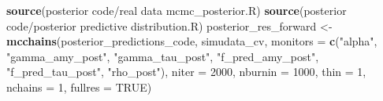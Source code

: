 \documentclass[
]{article}
\newenvironment{Shaded}{\begin{snugshade}}{\end{snugshade}}
\newcommand{\AttributeTok}[1]{\textcolor[rgb]{0.13,0.29,0.53}{#1}}
\newcommand{\CommentTok}[1]{\textcolor[rgb]{0.56,0.35,0.01}{\textit{#1}}}
\newcommand{\ConstantTok}[1]{\textcolor[rgb]{0.56,0.35,0.01}{#1}}
\newcommand{\DecValTok}[1]{\textcolor[rgb]{0.00,0.00,0.81}{#1}}
\newcommand{\FunctionTok}[1]{\textcolor[rgb]{0.13,0.29,0.53}{\textbf{#1}}}
\newcommand{\NormalTok}[1]{#1}
\newcommand{\OtherTok}[1]{\textcolor[rgb]{0.56,0.35,0.01}{#1}}
\newcommand{\SpecialCharTok}[1]{\textcolor[rgb]{0.81,0.36,0.00}{\textbf{#1}}}
\newcommand{\StringTok}[1]{\textcolor[rgb]{0.31,0.60,0.02}{#1}}
\begin{document}
\begin{Shaded}
\end{Shaded}

\begin{Shaded}
\begin{Highlighting}[]
\FunctionTok{source}\NormalTok{(}\StringTok{\textquotesingle{}posterior code/real data mcmc\_posterior.R\textquotesingle{}}\NormalTok{)}
\FunctionTok{source}\NormalTok{(}\StringTok{\textquotesingle{}posterior code/posterior predictive distribution.R\textquotesingle{}}\NormalTok{)}
\NormalTok{posterior\_res\_forward }\OtherTok{\textless{}{-}} \FunctionTok{mcchains}\NormalTok{(posterior\_predictions\_code,}
\NormalTok{                                  simudata\_cv,}
                                  \AttributeTok{monitors =} \FunctionTok{c}\NormalTok{(}\StringTok{"alpha"}\NormalTok{, }\StringTok{"gamma\_amy\_post"}\NormalTok{, }\StringTok{"gamma\_tau\_post"}\NormalTok{,}
                                               \StringTok{"f\_pred\_amy\_post"}\NormalTok{, }\StringTok{"f\_pred\_tau\_post"}\NormalTok{,}
                                               \StringTok{"rho\_post"}\NormalTok{),}
                                  \AttributeTok{niter =} \DecValTok{2000}\NormalTok{,}
                                  \AttributeTok{nburnin =} \DecValTok{1000}\NormalTok{,}
                                  \AttributeTok{thin =} \DecValTok{1}\NormalTok{,}
                                  \AttributeTok{nchains =} \DecValTok{1}\NormalTok{,}
                                  \AttributeTok{fullres =} \ConstantTok{TRUE}\NormalTok{)}
\end{Highlighting}
\end{Shaded}
\end{document}
